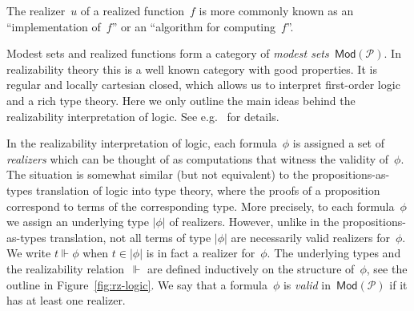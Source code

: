 \documentclass{article}
\newcommand{\ut}[1]{|#1|}
\newcommand{\PL}{\mathcal{P}}
\newcommand{\Mod}[1]{\mathsf{Mod}(#1)}
\newcommand{\rz}{\Vdash}
\begin{document}
The realizer~$u$ of a realized function~$f$ is more commonly known as
an ``implementation of~$f$'' or an ``algorithm for computing~$f$''.

Modest sets and realized functions form a category of \emph{modest
  sets~$\Mod{\PL}$}. In realizability theory this is a well known
category with good properties. It is regular and locally cartesian
closed, which allows us to interpret first-order logic and a rich type
theory. Here we only outline the main ideas behind the realizability
interpretation of logic. See e.g.~\cite{Bauer:00} for details.

In the realizability interpretation of logic, each formula~$\phi$ is
assigned a set of \emph{realizers} which can be thought of as
computations that witness the validity of~$\phi$. The situation is
somewhat similar (but not equivalent) to the propositions-as-types
translation of logic into type theory, where the proofs of a
proposition correspond to terms of the corresponding type. More
precisely, to each formula~$\phi$ we assign an underlying type
$\ut{\phi}$ of realizers. However, unlike in the propositions-as-types
translation, not all terms of type $\ut{\phi}$ are necessarily valid
realizers for~$\phi$. We write $t \rz \phi$ when $t \in \ut{\phi}$ is
in fact a realizer for~$\phi$. The underlying types and the
realizability relation~$\rz$ are defined inductively on the structure
of~$\phi$, see the outline in Figure~\ref{fig:rz-logic}. We say that a
formula~$\phi$ is \emph{valid} in~$\Mod{\PL}$ if it has at least one
realizer.
\end{document}
